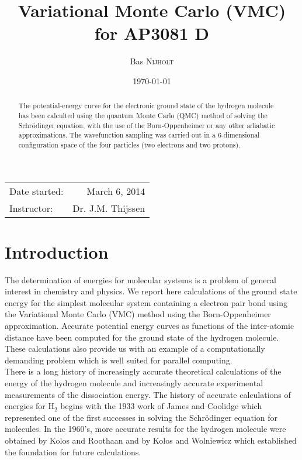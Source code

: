 \documentclass{article}
\title{Variational Monte Carlo (VMC) \\ for AP3081 D} %
\author{Bas \textsc{Nijholt}} %
\date{\today} %
\begin{document}
\maketitle %

\begin{center}
\begin{tabular}{l r}
Date started: & March 6, 2014 \\ 
Instructor: & Dr. J.M. Thijssen
\end{tabular}
\end{center}

\begin{abstract}
The potential-energy curve for the electronic ground state of the hydrogen molecule has been calculted using the quantum Monte Carlo (QMC) method of solving the Schrödinger equation, with the use of the Born-Oppenheimer or any other adiabatic approximations. The wavefunction sampling was carried out in a 6-dimensional configuration space of the four particles (two electrons and two protons).
\end{abstract}


\section{Introduction}
The determination of energies for molecular systems is a problem of general interest in chemistry and physics. We report here calculations of the ground state energy for the simplest molecular system containing a electron pair bond using the Variational Monte Carlo (VMC) method using the Born-Oppenheimer approximation. Accurate potential energy curves as functions of the inter-atomic distance have been computed for the ground state of the hydrogen molecule. \\

These calculations also provide us with an example of a computationally demanding problem which is well suited for parallel computing.\\ 

There is a long history of increasingly accurate theoretical calculations of the energy of the hydrogen molecule and increasingly accurate experimental measurements of the dissociation energy. The history of accurate calculations of energies for H$_2$ begins with the 1933 work of James and Coolidge \citep{james1933ground} which represented one of the first successes in solving the Schr\"odinger equation for molecules. In the 1960's, more accurate results for the hydrogen molecule were obtained by Kolos and Roothaan \citep{kolos1960accurate} and by Kolos and Wolniewicz \citep{kolos1963nonadiabatic, kol1964accurate, kol1965potential, kolos1968improved} which established the foundation for future calculations. \\
\end{document}

